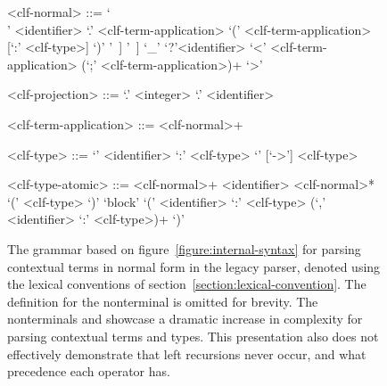 \begin{figure}[H]
\begin{grammar}
<clf-normal> ::=
     `\\' <identifier> `.' <clf-term-application>
\alt `(' <clf-term-application> [`:' <clf-type>] `)'
\alt <hash-identifier> [<clf-projection>] [ `[' <clf-substitution> `]' ]
\alt <qualified-identifier> [<clf-projection>] [ `[' <clf-substitution> `]' ]
\alt `_'
\alt `?'<identifier>
\alt `<' <clf-term-application> (`;' <clf-term-application>)+ `>'

<clf-projection> ::=
     `.' <integer>
\alt `.' <identifier>

<clf-term-application> ::=
     <clf-normal>+

<clf-type> ::=
     `{' <identifier> `:' <clf-type> `}' [`->'] <clf-type>

<clf-type-atomic> ::=
     <clf-normal>+
\alt <identifier> <clf-normal>*
\alt `(' <clf-type> `)'
\alt `block' `(' <identifier> `:' <clf-type> (`,' <identifier> `:' <clf-type>)+ `)'
\end{grammar}
\caption[The grammar for parsing contextual \acs{LF} terms in normal form in the legacy parser]{%
The grammar based on figure~\ref{figure:internal-syntax} for parsing contextual \LF terms in normal form in the legacy parser, denoted using the lexical conventions of section~\ref{section:lexical-convention}.
The definition for the nonterminal  is omitted for brevity.
The nonterminals  and  showcase a dramatic increase in complexity for parsing contextual \LF terms and types.
This presentation also does not effectively demonstrate that left recursions never occur, and what precedence each operator has.
}
\label{figure:legacy-clf-parsing}
\end{figure}

